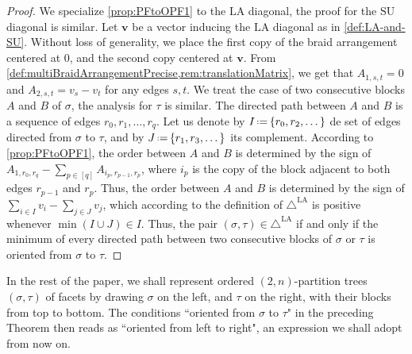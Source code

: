 \documentclass{amsart}
\theoremstyle{definition}
\renewcommand{\b}[1]{{\boldsymbol{#1}}} %
\newcommand{\eqdef}{\mbox{\,\raisebox{0.2ex}{\scriptsize\ensuremath{\mathrm:}}\ensuremath{=}\,}} %
\renewcommand{\b}[1]{\boldsymbol{#1}} %
\newcommand{\SU}{\mathrm{SU}}
\newcommand{\LA}{\mathrm{LA}}
\newcommand{\LAD}{\triangle^{\mathrm{LA}}}
\begin{document}
\begin{proof}
We specialize \cref{prop:PFtoOPF1} to the $\LA$ diagonal, the proof for the $\SU$ diagonal is similar. 
Let $\b{v}$ be a vector inducing the $\LA$ diagonal as in \cref{def:LA-and-SU}.
Without loss of generality, we place the first copy of the braid arrangement centered at $0$, and the second copy centered at $\b{v}$.
From \cref{def:multiBraidArrangementPrecise,rem:translationMatrix}, we get that $A_{1,s,t}=0$ and $A_{2,s,t}=v_s-v_t$ for any edges $s,t$.
We treat the case of two consecutive blocks $A$ and $B$ of $\sigma$, the analysis for $\tau$ is similar. 
The directed path between $A$ and $B$ is a sequence of edges $r_0,r_1,\dots,r_q$.  
Let us denote by $I \eqdef \{r_0,r_2,\dots\}$ de set of edges directed from $\sigma$ to $\tau$, and by $J \eqdef \{r_1,r_3,\dots\}$ its complement. 
According to \cref{prop:PFtoOPF1}, the order between $A$ and $B$ is determined by the sign of $A_{1,r_0,r_q}- \sum_{p \in [q]} A_{i_p,r_{p-1},r_p}$, where $i_p$ is the copy of the block adjacent to both edges $r_{p-1}$ and $r_p$. 
Thus, the order between $A$ and $B$ is determined by the sign of $\sum_{i \in I} v_i - \sum_{j \in J} v_j$, which according to the definition of $\LAD$ is positive whenever $\min(I\cup J) \in I$. 
Thus, the pair $(\sigma,\tau) \in \LAD$ if and only if the minimum of every directed path between two consecutive blocks of $\sigma$ or $\tau$ is oriented from $\sigma$ to $\tau$. 
\end{proof}

In the rest of the paper, we shall represent ordered $(2,n)$-partition trees $(\sigma,\tau)$ of facets by drawing $\sigma$ on the left, and $\tau$ on the right, with their blocks from top to bottom. 
The conditions ``oriented from $\sigma$ to $\tau$" in the preceding Theorem then reads as ``oriented from left to right", an expression we shall adopt from now on. 
\end{document}
